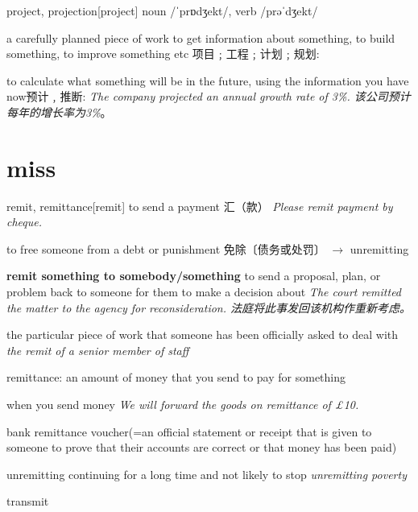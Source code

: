 \begin{DefWord}{project, projection}[project]
noun  /ˈprɒdʒekt/, verb /prəˈdʒekt/

a carefully planned piece of work to get information about something, to build something, to improve something etc 项目﹔工程﹔计划﹔规划:

to calculate what something will be in the future, using the information you have now预计﹐推断:
 \textit{The company projected an annual growth rate of 3\%. 该公司预计每年的增长率为3\%}。

\end{DefWord}









\section{miss}

\begin{DefWord}{remit, remittance}[remit]
    to send a payment 汇（款）
    \textit{Please remit payment by cheque.}

    to free someone from a debt or punishment 免除〔债务或处罚〕 $\rightarrow$  unremitting

    \textbf{remit something to somebody/something}
    to send a proposal, plan, or problem back to someone for them to make a decision about
    \textit{The court remitted the matter to the agency for reconsideration. 法庭将此事发回该机构作重新考虑。}

    the particular piece of work that someone has been officially asked to deal with
    \textit{the remit of a senior member of staff}

    remittance: an amount of money that you send to pay for something

    when you send money
    \textit{We will forward the goods on remittance of £10.}

    bank remittance voucher(=an official statement or receipt that is given to someone to prove that their accounts are correct or that money has been paid)
\end{DefWord}

\begin{DefWord}{unremitting}
    continuing for a long time and not likely to stop
    \textit{unremitting poverty}
\end{DefWord}

\begin{DefWord}{transmit}
\end{DefWord}

